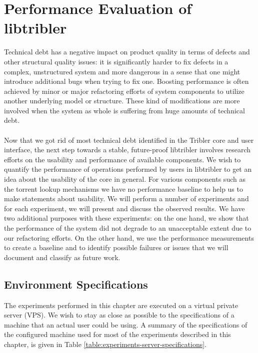 \chapter{Performance Evaluation of libtribler}
\label{chapter:experiments}

Technical debt has a negative impact on product quality in terms of defects and other structural quality issues\cite{tom2013exploration}: it is significantly harder to fix defects in a complex, unstructured system and more dangerous in a sense that one might introduce additional bugs when trying to fix one. Boosting performance is often achieved by minor or major refactoring efforts of system components to utilize another underlying model or structure. These kind of modifications are more involved when the system as whole is suffering from huge amounts of technical debt.\\\\
Now that we got rid of most technical debt identified in the Tribler core and user interface, the next step towards a stable, future-proof libtribler involves research efforts on the usability and performance of available components. We wish to quantify the performance of operations performed by users in libtribler to get an idea about the usability of the core in general. For various components such as the torrent lookup mechanisms we have no performance baseline to help us to make statements about usability. We will perform a number of experiments and for each experiment, we will present and discuss the observed results. We have two additional purposes with these experiments: on the one hand, we show that the performance of the system did not degrade to an unacceptable extent due to our refactoring efforts. On the other hand, we use the performance measurements to create a baseline and to identify possible failures or issues that we will document and classify as future work.

\section{Environment Specifications}
\label{sec:environment-specifications}
The experiments performed in this chapter are executed on a virtual private server (VPS). We wish to stay as close as possible to the specifications of a machine that an actual user could be using. A summary of the specifications of the configured machine used for most of the experiments described in this chapter, is given in Table \ref{table:experiments-server-specifications}.


